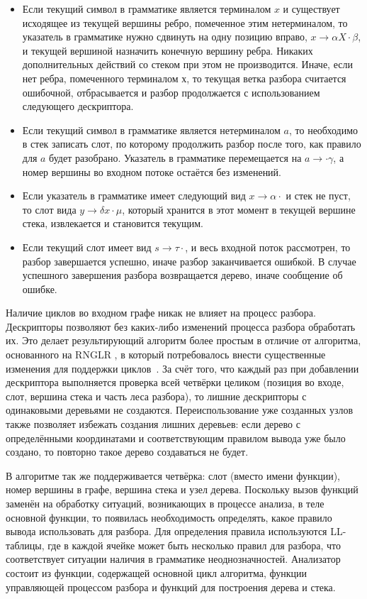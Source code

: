 \documentclass[14pt]{matmex-diploma}
\begin{document}
\begin{itemize}
\item Если текущий символ в грамматике является терминалом $x$ и существует исходящее из текущей вершины ребро, помеченное этим нетерминалом, то указатель в грамматике нужно сдвинуть на одну позицию вправо, $x \rightarrow \alpha X \cdot \beta$, и текущей вершиной назначить конечную вершину ребра. Никаких дополнительных действий со стеком при этом не производится. Иначе, если нет ребра, помеченного терминалом $х$, то текущая ветка разбора считается ошибочной, отбрасывается и  разбор продолжается с использованием следующего дескриптора.
\item Если текущий символ в грамматике является нетерминалом $a$, то необходимо в стек записать слот, по которому продолжить разбор после того, как правило для $a$ будет разобрано. Указатель в грамматике перемещается на $a \rightarrow \cdot \gamma $, а номер вершины во входном потоке остаётся без изменений.
\item Если указатель в грамматике имеет следующий вид $x \rightarrow \alpha\cdot$ и стек не пуст, то слот вида $y \rightarrow \delta x \cdot \mu$, который хранится в этот момент в текущей вершине стека, извлекается и становится текущим.
\item Если текущий слот имеет вид $s \rightarrow \tau\cdot$, и весь входной поток рассмотрен, то разбор завершается успешно, иначе разбор заканчивается ошибкой. В случае успешного завершения разбора возвращается дерево, иначе сообщение об ошибке.
\end{itemize}

Наличие циклов во входном графе никак не влияет на процесс разбора. Дескрипторы позволяют без каких-либо изменений процесса разбора обработать их. Это делает результирующий алгоритм более простым в отличие от алгоритма, основанного на RNGLR , в который потребовалось внести существенные изменения для поддержки циклов~\cite{RelaxedARNGLR}. За счёт того, что каждый раз при добавлении дескриптора выполняется проверка всей четвёрки целиком (позиция во входе, слот, вершина стека и часть леса разбора), то лишние дескрипторы с одинаковыми деревьями не создаются. Переиспользование уже созданных узлов также позволяет избежать создания лишних деревьев: если дерево с определёнными координатами и соответствующим правилом вывода уже было создано, то повторно такое дерево создаваться не будет.

В алгоритме так же поддерживается четвёрка: слот (вместо имени функции), номер вершины в графе, вершина стека и узел дерева. Поскольку вызов функций заменён на обработку ситуаций, возникающих в процессе анализа, в теле основной функции, то появилась необходимость определять, какое правило вывода использовать для разбора. Для определения правила используются LL-таблицы, где в каждой ячейке может быть несколько правил для разбора, что соответствует ситуации наличия в грамматике неоднозначностей. Анализатор состоит из функции, содержащей основной цикл алгоритма, функции управляющей процессом разбора и функций для построения дерева и стека.
\end{document}
